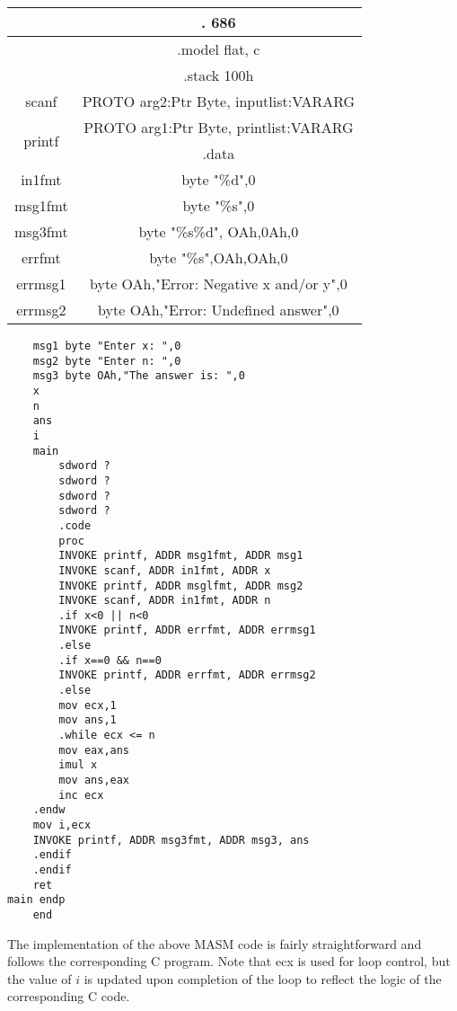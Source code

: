 \documentclass[10pt]{article}
\begin{document}
\begin{center}
\begin{tabular}{|c|c|}
\hline
\multirow[t]{3}{*}{} & . 686 \\
\hline
 & .model flat, c \\
\hline
 & .stack 100h \\
\hline
scanf & PROTO arg2:Ptr Byte, inputlist:VARARG \\
\hline
\multirow[t]{2}{*}{printf} & PROTO arg1:Ptr Byte, printlist:VARARG \\
\hline
 & .data \\
\hline
in1fmt & byte "\%d",0 \\
\hline
msg1fmt & byte "\%s",0 \\
\hline
msg3fmt & byte "\%s\%d", OAh,0Ah,0 \\
\hline
errfmt & byte "\%s",OAh,OAh,0 \\
\hline
errmsg1 & byte OAh,"Error: Negative x and/or y",0 \\
\hline
errmsg2 & byte OAh,"Error: Undefined answer",0 \\
\hline
\end{tabular}
\end{center}

\begin{verbatim}
    msg1 byte "Enter x: ",0
    msg2 byte "Enter n: ",0
    msg3 byte OAh,"The answer is: ",0
    x
    n
    ans
    i
    main
        sdword ?
        sdword ?
        sdword ?
        sdword ?
        .code
        proc
        INVOKE printf, ADDR msg1fmt, ADDR msg1
        INVOKE scanf, ADDR in1fmt, ADDR x
        INVOKE printf, ADDR msglfmt, ADDR msg2
        INVOKE scanf, ADDR in1fmt, ADDR n
        .if x<0 || n<0
        INVOKE printf, ADDR errfmt, ADDR errmsg1
        .else
        .if x==0 && n==0
        INVOKE printf, ADDR errfmt, ADDR errmsg2
        .else
        mov ecx,1
        mov ans,1
        .while ecx <= n
        mov eax,ans
        imul x
        mov ans,eax
        inc ecx
    .endw
    mov i,ecx
    INVOKE printf, ADDR msg3fmt, ADDR msg3, ans
    .endif
    .endif
    ret
main endp
    end
\end{verbatim}

The implementation of the above MASM code is fairly straightforward and follows the corresponding C program. Note that ecx is used for loop control, but the value of $i$ is updated upon completion of the loop to reflect the logic of the corresponding C code.
\end{document}
